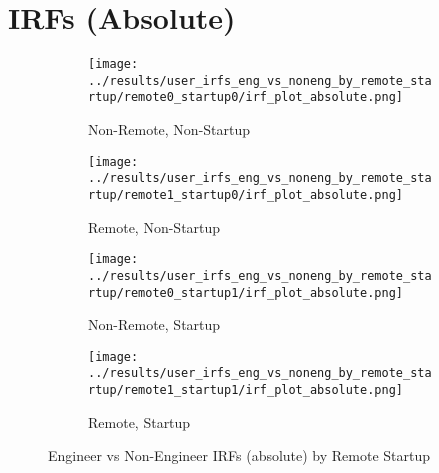 \documentclass[11pt]{article}
\begin{document}
\section*{IRFs (Absolute)}
\begin{figure}[H]
  \centering
  \begin{subfigure}[t]{0.48\linewidth}
    \centering
    \texttt{[image: ../results/user\_irfs\_eng\_vs\_noneng\_by\_remote\_startup/remote0\_startup0/irf\_plot\_absolute.png]}
    \caption{Non-Remote, Non-Startup}
  \end{subfigure}\hfill
  \begin{subfigure}[t]{0.48\linewidth}
    \centering
    \texttt{[image: ../results/user\_irfs\_eng\_vs\_noneng\_by\_remote\_startup/remote1\_startup0/irf\_plot\_absolute.png]}
    \caption{Remote, Non-Startup}
  \end{subfigure}

  \begin{subfigure}[t]{0.48\linewidth}
    \centering
    \texttt{[image: ../results/user\_irfs\_eng\_vs\_noneng\_by\_remote\_startup/remote0\_startup1/irf\_plot\_absolute.png]}
    \caption{Non-Remote, Startup}
  \end{subfigure}\hfill
  \begin{subfigure}[t]{0.48\linewidth}
    \centering
    \texttt{[image: ../results/user\_irfs\_eng\_vs\_noneng\_by\_remote\_startup/remote1\_startup1/irf\_plot\_absolute.png]}
    \caption{Remote, Startup}
  \end{subfigure}
  \caption{Engineer vs Non-Engineer IRFs (absolute) by Remote\,\texttimes\,Startup}
\end{figure}
\end{document}
